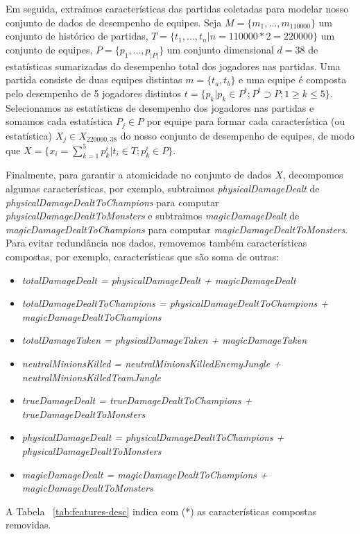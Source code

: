 Em seguida, extraímos características das partidas coletadas para modelar nosso conjunto de dados de desempenho de equipes. Seja $M=\{m_1,...,m_{110000}\}$ um conjunto de histórico de partidas, $T=\{t_1, ..., t_n | n=110000 * 2=220000\}$ um conjunto de equipes, $P=\{p_1, ..., p_{|P|}\}$ um conjunto dimensional $d=38$ de estatísticas sumarizadas do desempenho total dos jogadores nas partidas. Uma partida consiste de duas equipes distintas $m=\{t_a,t_b\}$ e uma equipe é composta pelo desempenho de 5 jogadores distintos $t=\{p_k |  p_k \in P^t; P^t \supset P; 1 \geq k \leq 5\}$. Selecionamos as estatísticas de desempenho dos jogadores nas partidas e somamos cada estatística $P_j \in P$ por equipe para formar cada característica (ou estatística) $X_j \in X_{220000, 38}$ do nosso conjunto de desempenho de equipes, de modo que $X = \{ x_{i} = \sum_{k=1}^{5} p_{k}^{i} | t_{i} \in T; p_{k}^{i} \in P \}$.

Finalmente, para garantir a atomicidade no conjunto de dados $X$, decompomos algumas características, por exemplo, subtraimos \textit{physicalDamageDealt} de \textit{physicalDamageDealtToChampions} para computar \textit{physicalDamageDealtToMonsters} e subtraimos \textit{magicDamageDealt} de \textit{magicDamageDealtToChampions} para computar \textit{magicDamageDealtToMonsters}. Para evitar redundância nos dados, removemos também características compostas, por exemplo, características que são soma de outras:

\begin{itemize}
  \item \textit{totalDamageDealt = physicalDamageDealt + magicDamageDealt}
  \item \textit{totalDamageDealtToChampions = physicalDamageDealtToChampions + magicDamageDealtToChampions}
  \item \textit{totalDamageTaken = physicalDamageTaken + magicDamageTaken}
  \item \textit{neutralMinionsKilled = neutralMinionsKilledEnemyJungle + neutralMinionsKilledTeamJungle}
  \item \textit{trueDamageDealt = trueDamageDealtToChampions + trueDamageDealtToMonsters}
  \item \textit{physicalDamageDealt = physicalDamageDealtToChampions + physicalDamageDealtToMonsters}
  \item \textit{magicDamageDealt = magicDamageDealtToChampions + magicDamageDealtToMonsters}
\end{itemize}

A Tabela ~\ref{tab:features-desc} indica com (*) as características compostas removidas.

